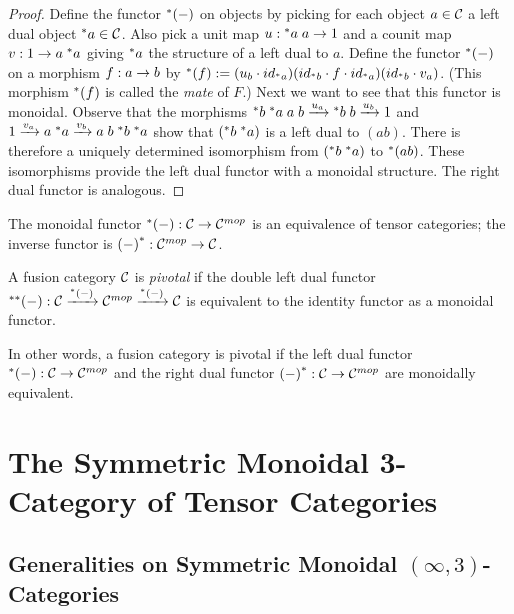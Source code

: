 \documentclass{amsart}
\begin{document}
\begin{proof}
Define the functor ${}^*{(-)}$ on objects by picking for each object $a \in \mathcal C$ a left dual object ${}^*{a} \in \mathcal C$.  Also pick a unit map $u: {}^*{a} \; a \rightarrow 1$ and a counit map $v: 1 \rightarrow a \; {}^*{a}$ giving ${}^*{a}$ the structure of a left dual to $a$.  Define the functor ${}^*{(-)}$ on a morphism $f: a \rightarrow b$ by ${}^*{(f)} := (u_b \cdot {id}_{{}^*{a}}) ({id}_{{}^*{b}} \cdot f \cdot {id}_{{}^*{a}}) ({id}_{{}^*{b}} \cdot v_a)$.  (This morphism ${}^*{(f)}$ is called the \emph{mate} of $F$.)  Next we want to see that this functor is monoidal.  Observe that the morphisms ${}^*{b} \; {}^*{a} \; a \; b \xrightarrow{u_a} {}^*{b} \; b \xrightarrow{u_b} 1$ and $1 \xrightarrow{v_a} a \; {}^*{a} \xrightarrow{v_b} a \; b \; {}^*{b} \; {}^*{a}$ show that $({}^*{b} \; {}^*{a})$ is a left dual to $(a b)$.  There is therefore a uniquely determined isomorphism from $({}^*{b} \; {}^*{a})$ to ${}^*{(a b)}$.  These isomorphisms provide the left dual functor with a monoidal structure.  The right dual functor is analogous.  %
\end{proof}

\begin{remark}
The monoidal functor ${}^*{(-)}: \mathcal C \rightarrow \mathcal C^{{mop}}$ is an equivalence of tensor categories; the inverse functor is ${(-)}^*: \mathcal C^{{mop}} \rightarrow \mathcal C$.
\end{remark}

\begin{definition}
A fusion category $\mathcal C$ is \emph{pivotal} if the double left dual functor ${}^{**}{(-)}: \mathcal C \xrightarrow{{}^*{(-)}} \mathcal C^{{mop}} \xrightarrow{{}^*{(-)}} \mathcal C$ is equivalent to the identity functor as a monoidal functor.
\end{definition}

In other words, a fusion category is pivotal if the left dual functor ${}^*{(-)}: \mathcal C \rightarrow \mathcal C^{{mop}}$ and the right dual functor ${(-)}^*: \mathcal C \rightarrow \mathcal C^{{mop}}$ are monoidally equivalent.





\section{The Symmetric Monoidal 3-Category of Tensor Categories}

\subsection{Generalities on Symmetric Monoidal $(\infty,3)$-Categories}
\end{document}
